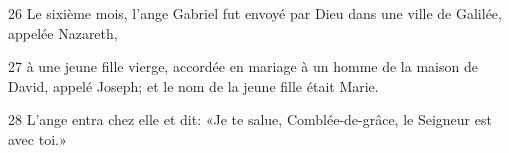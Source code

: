 26 Le sixième mois, l’ange Gabriel fut envoyé par Dieu dans une ville de Galilée, appelée Nazareth,

27 à une jeune fille vierge, accordée en mariage à un homme de la maison de David, appelé Joseph; et le nom de la jeune fille était Marie.

28 L’ange entra chez elle et dit: «Je te salue, Comblée-de-grâce, le Seigneur est avec toi.»
